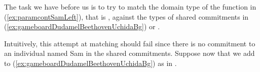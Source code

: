 The task we have before us is to try to match the domain type of the function
in (\ref{ex:paramcontSamLeft}), that is \nexteg{}, against the types of shared commitments
in (\ref{ex:gameboardDudamelBeethovenUchidaBg}) or \preveg{}.
\begin{ex} 
\label{ex:namedSam} 
\end{ex} 
Intuitively, this attempt at matching should fail since there is no
commitment to an individual named Sam in the shared commitments.
Suppose now that we add to
(\ref{ex:gameboardDudamelBeethovenUchidaBg}) as in \nexteg{}.
\begin{ex} 
\label{ex:sharedcommsnonexpanded}
\end{ex} 
